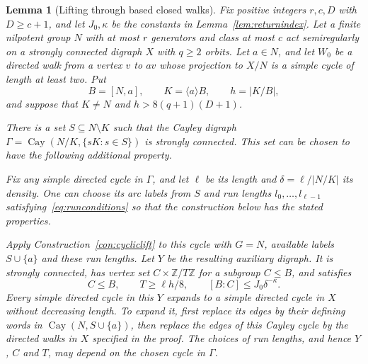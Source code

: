 \documentclass[11pt,a4paper,reqno]{amsart}
\newtheorem{lemma}[theorem]{Lemma}
\theoremstyle{definition}
\theoremstyle{remark}
\numberwithin{equation}{section}
\DeclareMathOperator{\Cay}{Cay}
\newcommand{\Z}{\mathbb Z}
\newcommand{\gen}[1]{\langle #1\rangle}
\begin{document}
\begin{lemma}[Lifting through based closed walks]\label{lem:return-lifting}
Fix positive integers $r,c,D$ with $D\ge c+1$, and let $J_0,\kappa$ be the constants in Lemma~\ref{lem:returnindex}. Let a finite nilpotent group $N$ with at most $r$ generators and class at most $c$ act semiregularly on a strongly connected digraph $X$ with $q\ge2$ orbits. Let $a\in N$, and let $W_0$ be a directed walk from a vertex $v$ to $av$ whose projection to $X/N$ is a simple cycle of length at least two. Put
\[
 B=[N,a],\qquad K=\gen aB,\qquad h=|K/B|,
\]
and suppose that $K\ne N$ and $h>8(q+1)(D+1)$.

There is a set $S\subseteq N\setminus K$ such that the Cayley digraph $\Gamma=\Cay(N/K,\{sK:s\in S\})$ is strongly connected. This set can be chosen to have the following additional property.

Fix any simple directed cycle in $\Gamma$, and let $\ell$ be its length and $\delta=\ell/|N/K|$ its density. One can choose its arc labels from $S$ and run lengths $l_0,\ldots,l_{\ell-1}$ satisfying~\eqref{eq:runconditions} so that the construction below has the stated properties.

Apply Construction~\ref{con:cycliclift} to this cycle with $G=N$, available labels $S\cup\{a\}$ and these run lengths. Let $Y$ be the resulting auxiliary digraph. It is strongly connected, has vertex set $C\times\Z/T\Z$ for a subgroup $C\le B$, and satisfies
\begin{equation}\label{eq:return-lift-bounds}
 C\le B,\qquad T\ge\ell h/8,\qquad [B:C]\le J_0\delta^{-\kappa}.
\end{equation}
Every simple directed cycle in this $Y$ expands to a simple directed cycle in $X$ without decreasing length. To expand it, first replace its edges by their defining words in $\Cay(N,S\cup\{a\})$, then replace the edges of this Cayley cycle by the directed walks in $X$ specified in the proof. The choices of run lengths, and hence $Y$, $C$ and $T$, may depend on the chosen cycle in $\Gamma$.
\end{lemma}
\end{document}

